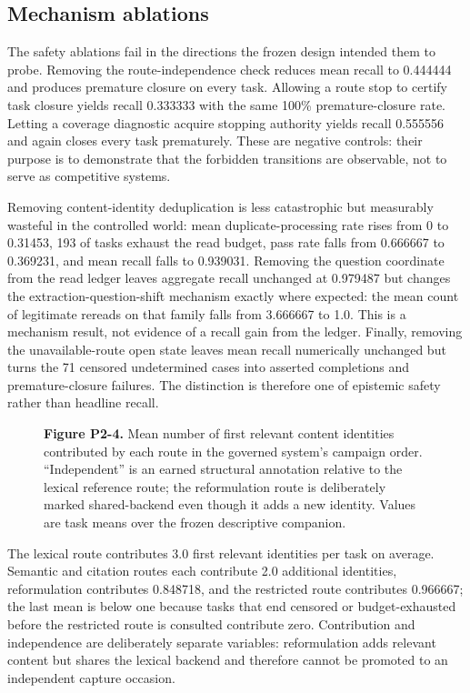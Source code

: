 \subsection{Mechanism ablations}
The safety ablations fail in the directions the frozen design intended them to
probe.  Removing the route-independence check reduces mean recall to 0.444444
and produces premature closure on every task.  Allowing a route stop to certify
task closure yields recall 0.333333 with the same 100\% premature-closure rate.
Letting a coverage diagnostic acquire stopping authority yields recall 0.555556
and again closes every task prematurely.  These are negative controls: their
purpose is to demonstrate that the forbidden transitions are observable, not to
serve as competitive systems.

Removing content-identity deduplication is less catastrophic but measurably
wasteful in the controlled world: mean duplicate-processing rate rises from 0
to 0.31453, 193 of \OfflineTaskCount{} tasks exhaust the read budget, pass rate falls from 0.666667
to 0.369231, and mean recall falls to 0.939031.  Removing the question coordinate
from the read ledger leaves aggregate recall unchanged at 0.979487 but changes
the extraction-question-shift mechanism exactly where expected: the mean count
of legitimate rereads on that family falls from 3.666667 to 1.0.  This is a mechanism
result, not evidence of a recall gain from the ledger.  Finally, removing the
unavailable-route open state leaves mean recall numerically unchanged but turns
the 71 censored undetermined cases into asserted completions and
premature-closure failures.  The distinction is therefore one of epistemic
safety rather than headline recall.

\begin{figure}[t]
\centering

\caption{\textbf{Figure P2-4.} Mean number of first relevant content identities
contributed by each route in the governed system's campaign order.  ``Independent'' is an
earned structural annotation relative to the lexical reference route; the
reformulation route is deliberately marked shared-backend even though it adds a
new identity.  Values are task means over the frozen descriptive companion.}
\label{fig:p2-4}
\end{figure}

The lexical route contributes 3.0 first relevant identities per task on
average.  Semantic and citation routes each contribute 2.0 additional identities,
reformulation contributes 0.848718, and the restricted route contributes 0.966667;
the last mean is below one because tasks that end censored or budget-exhausted
before the restricted route is consulted contribute zero.  Contribution and
independence are deliberately separate variables: reformulation adds relevant
content but shares the lexical backend and therefore cannot be promoted to an
independent capture occasion.

